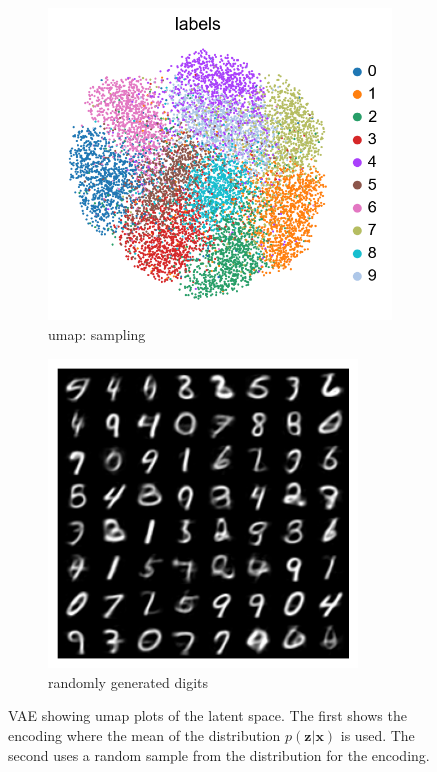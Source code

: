\documentclass[11pt, a4paper]{report}
\theoremstyle{plain}
\theoremstyle{definition}
\theoremstyle{remark}
\newcommand{\x}{\mathbf{x}}
\newcommand{\z}{\mathbf{z}}
\begin{document}
\begin{figure}[!h]
\begin{framed}
\begin{subfigure}[t]{0.3\textwidth}
\includegraphics[width=\textwidth]{images/vae.umap.mnist.sampling.png}
\caption{umap: sampling}
\end{subfigure}
\begin{subfigure}[t]{0.3\textwidth}
\includegraphics[width=0.9\textwidth]{images/vae.generation.mnist.sampling.png}
\caption{randomly generated digits}
\end{subfigure}
\caption{VAE showing umap plots of the latent space. The first shows 
the encoding where the mean of the distribution $p(\z | \x)$ is used. The second
uses a random sample from the distribution for the encoding.}
\label{fig:vaeumap}
\end{framed}
\end{figure}
\end{document}
